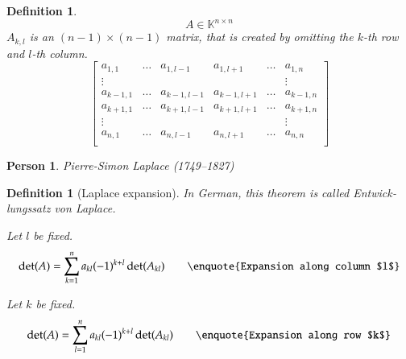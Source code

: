 \documentclass[a4paper]{article}
\newcounter{lecref}[section]
\numberwithin{lecref}{section}
\newtheorem{definition}[lecref]{Definition}
\newtheorem*{Person}{Person}
\begin{document}
\begin{definition}
  \[ A \in \mathbb K^{n\times n} \]
  $A_{k,l}$ is an $(n-1) \times (n-1)$ matrix, that is created by omitting the $k$-th row and $l$-th column.
  \[
    \begin{bmatrix}
      a_{1,1} & \ldots & a_{1,l-1} & a_{1,l+1} & \ldots & a_{1,n} \\
      \vdots  &        &           &           &        & \vdots \\
      a_{k-1,1} & \ldots & a_{k-1,l-1} & a_{k-1,l+1} & \ldots & a_{k-1,n} \\
      a_{k+1,1} & \ldots & a_{k+1,l-1} & a_{k+1,l+1} & \ldots & a_{k+1,n} \\
      \vdots  &        &           &           &        & \vdots \\
      a_{n,1} & \ldots & a_{n,l-1} & a_{n,l+1} & \ldots & a_{n,n} \\
    \end{bmatrix}
  \]
\end{definition}

\begin{Person}
  Pierre-Simon Laplace (1749--1827)
\end{Person}
\begin{definition}[Laplace expansion] %
  In German, this theorem is called \foreignlanguage{german}{Entwicklungssatz von Laplace}.
  
  Let $l$ be fixed.
  \[ \det(A) = \sum_{k=1}^n a_{kl} (-1)^{k+l} \det(A_{kl}) \qquad \text{\enquote{Expansion along column $l$}} \]

  Let $k$ be fixed.
  \[ \det(A) = \sum_{l=1}^n a_{kl} (-1)^{k+l} \det(A_{kl}) \qquad \text{\enquote{Expansion along row $k$}} \]
\end{definition}
\end{document}
